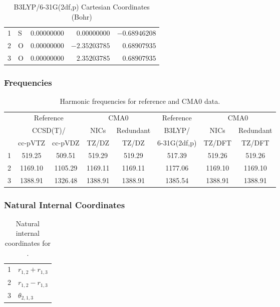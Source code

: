\documentclass[10pt,oneside]{article}
\begin{document}
\begin{table}[h]
\centering
\caption{B3LYP/6-31G(2df,p) Cartesian Coordinates (Bohr)}
\begin{tabular}{llrrr}
\toprule
1  & S  & $ 0.00000000$ & $ 0.00000000$ & $-0.68946208$ \\
2  & O  & $ 0.00000000$ & $-2.35203785$ & $ 0.68907935$ \\
3  & O  & $ 0.00000000$ & $ 2.35203785$ & $ 0.68907935$ \\
\bottomrule
\end{tabular}
\end{table}

\begin{table}[h!]
\subsubsection*{Frequencies}
\centering
\caption{Harmonic frequencies for reference and CMA0 data.}
\begin{tabular}{cccccccc}
\toprule
{} & \multicolumn{2}{c}{Reference} & \multicolumn{2}{c}{CMA0} &    Reference & \multicolumn{2}{c}{CMA0} \\
{} & \multicolumn{2}{c}{CCSD(T)/} &    NICs &  Redundant &       B3LYP/ &    NICs & Redundant \\
{} &   cc-pVTZ & cc-pVDZ &   TZ/DZ &      TZ/DZ & 6-31G(2df,p) &  TZ/DFT &    TZ/DFT \\
\midrule
1 &    519.25 &  509.51 &  519.29 &     519.29 &       517.39 &  519.26 &    519.26 \\
2 &   1169.10 & 1105.29 & 1169.11 &    1169.11 &      1177.06 & 1169.10 &   1169.10 \\
3 &   1388.91 & 1326.48 & 1388.91 &    1388.91 &      1385.54 & 1388.91 &   1388.91 \\
\bottomrule
\end{tabular}
\end{table}

\begin{table}[h!]
\subsubsection*{Natural Internal Coordinates}
\centering
\caption{Natural internal coordinates for .}
\small
\begin{tabular}{ll}
\toprule
  1   & $r_{1,2} + r_{1,3}$ \\
  2   & $r_{1,2} - r_{1,3}$ \\
  3   & $\theta_{2,1,3}$ \\
\bottomrule
\end{tabular}
\end{table}
\end{document}
